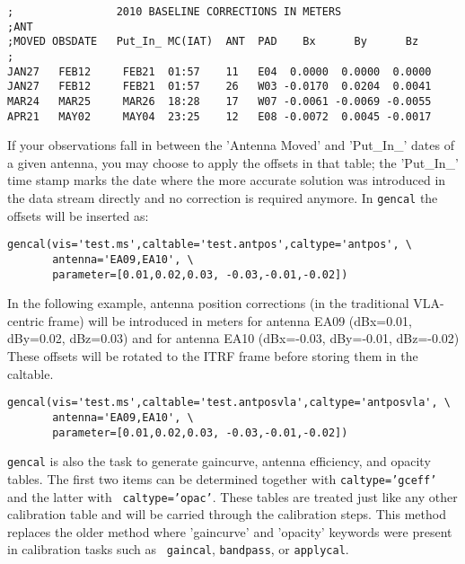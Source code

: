 \begin{verbatim}
;                2010 BASELINE CORRECTIONS IN METERS
;ANT
;MOVED OBSDATE   Put_In_ MC(IAT)  ANT  PAD    Bx      By      Bz
;
JAN27   FEB12     FEB21  01:57    11   E04  0.0000  0.0000  0.0000
JAN27   FEB12     FEB21  01:57    26   W03 -0.0170  0.0204  0.0041
MAR24   MAR25     MAR26  18:28    17   W07 -0.0061 -0.0069 -0.0055
APR21   MAY02     MAY04  23:25    12   E08 -0.0072  0.0045 -0.0017
\end{verbatim}


If your observations fall in between the 'Antenna Moved' and
'Put\_In\_' dates of a given antenna, you may choose to apply the
offsets in that table; the 'Put\_In\_' time stamp marks the date where
the more accurate solution was introduced in the data stream directly
and no correction is required anymore. In {\tt gencal} the offsets
will be inserted as:



\small
\begin{verbatim}
gencal(vis='test.ms',caltable='test.antpos',caltype='antpos', \
       antenna='EA09,EA10', \
       parameter=[0.01,0.02,0.03, -0.03,-0.01,-0.02])
\end{verbatim}
\normalsize


In the following example, antenna position corrections (in the
traditional VLA-centric frame) will be introduced in meters for
antenna EA09 (dBx=0.01, dBy=0.02, dBz=0.03) and for antenna EA10
(dBx=-0.03, dBy=-0.01, dBz=-0.02) These offsets will be rotated to the
ITRF frame before storing them in the caltable.

\small
\begin{verbatim}
gencal(vis='test.ms',caltable='test.antposvla',caltype='antposvla', \
       antenna='EA09,EA10', \
       parameter=[0.01,0.02,0.03, -0.03,-0.01,-0.02])
\end{verbatim}
\normalsize

{\tt gencal} is also the task to generate gaincurve, antenna
efficiency, and opacity tables. The first two items can be determined
together with {\tt caltype='gceff'} and the latter with {\tt
  caltype='opac'}. These tables are treated just like any other
calibration table and will be carried through the calibration
steps. This method replaces the older method where 'gaincurve' and
'opacity' keywords were present in calibration tasks such as {\tt
  gaincal}, {\tt bandpass}, or {\tt applycal}.



